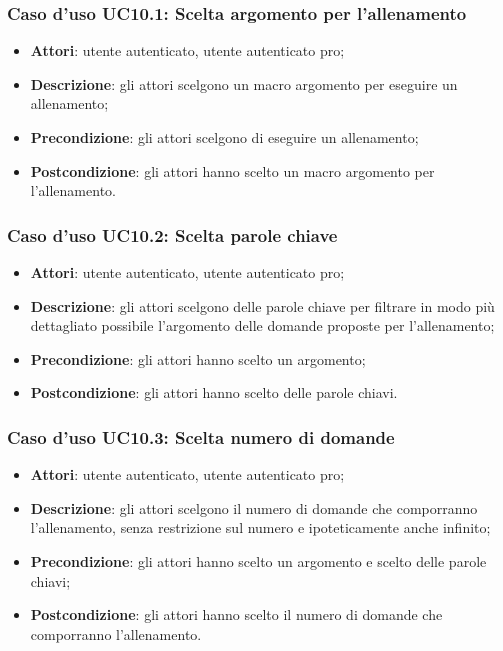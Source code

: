 \subsubsection{Caso d'uso UC10.1: Scelta argomento per l'allenamento}
	\begin{itemize}
		\item \textbf{Attori}: utente autenticato, utente autenticato pro;
		\item \textbf{Descrizione}: gli attori scelgono un macro argomento per eseguire un allenamento;
		\item \textbf{Precondizione}: gli attori scelgono di eseguire un allenamento;
		\item \textbf{Postcondizione}: gli attori hanno scelto un macro argomento per l'allenamento.
	\end{itemize}
\subsubsection{Caso d'uso UC10.2: Scelta parole chiave}
	\begin{itemize}
		\item \textbf{Attori}: utente autenticato, utente autenticato pro;
		\item \textbf{Descrizione}: gli attori scelgono delle parole chiave per filtrare in modo più dettagliato possibile l'argomento delle domande proposte per l'allenamento;
		\item \textbf{Precondizione}: gli attori hanno scelto un argomento;
		\item \textbf{Postcondizione}: gli attori hanno scelto delle parole chiavi.
	\end{itemize}
\subsubsection{Caso d'uso UC10.3: Scelta numero di domande}
	\begin{itemize}
		\item \textbf{Attori}: utente autenticato, utente autenticato pro;
		\item \textbf{Descrizione}: gli attori scelgono il numero di domande che comporranno l'allenamento, senza restrizione sul numero e ipoteticamente anche infinito;
		\item \textbf{Precondizione}: gli attori hanno scelto un argomento e scelto delle parole chiavi;
		\item \textbf{Postcondizione}: gli attori hanno scelto il numero di domande che comporranno l'allenamento.
	\end{itemize}
